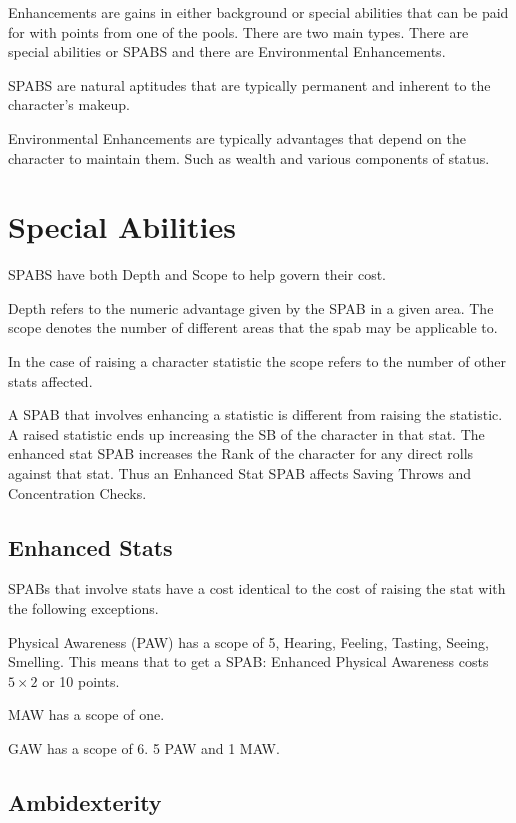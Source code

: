 Enhancements are gains in either background or special abilities that 
can be paid for with points from one of the pools. There are two main 
types. There are special abilities or SPABS and there are 
Environmental Enhancements.  

SPABS are natural aptitudes that are typically permanent and inherent 
to the character's makeup.

Environmental Enhancements are typically advantages that depend on  the
character to maintain them. Such as wealth and various components of
status. 



\section{Special Abilities}

SPABS have both Depth and Scope to help govern their cost.

Depth refers to the numeric advantage given by the SPAB in a given 
area. The scope denotes the number of different areas that the spab 
may be applicable to. 

In the case of raising a character statistic the scope refers to the 
number of other stats affected.

A SPAB that involves enhancing a statistic is different from raising the
statistic. A raised statistic ends up increasing the SB of the character
in that stat. The enhanced stat SPAB increases the Rank of the character
for any direct rolls against that stat. Thus an Enhanced Stat SPAB
affects Saving Throws and Concentration Checks.

\subsection{Enhanced Stats}
SPABs that involve stats have a cost identical to the cost of raising
the stat with the following exceptions.

Physical Awareness (PAW) has a scope of 5, Hearing, Feeling, Tasting, 
Seeing, Smelling. This means that to get a SPAB: Enhanced Physical
Awareness costs \( 5 \times 2 \) or 10 points.

MAW has a scope of one. 

GAW has a scope of 6. 5 PAW and 1 MAW.

\subsection{Ambidexterity}
